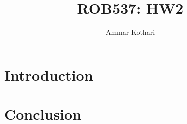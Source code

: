 \documentclass[a4paper]{article}
\title{ROB537: HW2}
\author{Ammar Kothari}
\date{}
\begin{document}
\maketitle


\section{Introduction}






\section{Conclusion}

% 
% 
\end{document}
